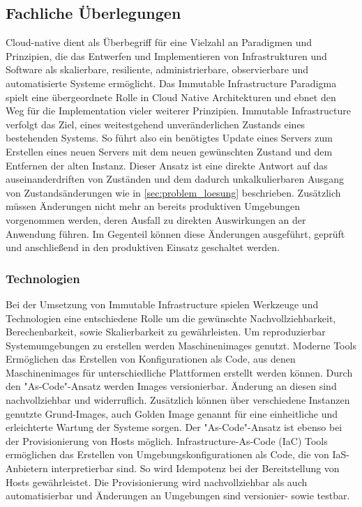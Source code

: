 \documentclass[11pt]{scrartcl}
\begin{document}
\subsection{Fachliche Überlegungen}
Cloud-native dient als Überbegriff für eine Vielzahl an Paradigmen und Prinzipien, die das Entwerfen und Implementieren von Infrastrukturen und Software als skalierbare, resiliente, administrierbare, observierbare und automatisierte Systeme ermöglicht.
Das Immutable Infrastructure Paradigma spielt eine übergeordnete Rolle in Cloud Native Architekturen und ebnet den Weg für die Implementation vieler weiterer Prinzipien. Immutable Infrastructure verfolgt das Ziel, eines weitestgehend unveränderlichen Zustands eines bestehenden Systems. So führt also ein benötigtes Update eines Servers zum Erstellen eines neuen Servers mit dem neuen gewünschten Zustand und dem Entfernen der alten Instanz. Dieser Ansatz ist eine direkte Antwort auf das auseinanderdriften von Zuständen und dem dadurch unkalkulierbaren Ausgang von Zustandsänderungen wie in \cref{sec:problem_loesung} beschrieben. Zusätzlich müssen Änderungen nicht mehr an bereits produktiven Umgebungen vorgenommen werden, deren Ausfall zu direkten Auswirkungen an der Anwendung führen. Im Gegenteil können diese Änderungen ausgeführt, geprüft und anschließend in den produktiven Einsatz geschaltet werden.
\subsubsection{Technologien} 
Bei der Umsetzung von Immutable Infrastructure spielen Werkzeuge und Technologien eine entschiedene Rolle um die gewünschte Nachvollziehbarkeit, Berechenbarkeit, sowie Skalierbarkeit zu gewährleisten.
\newline Um reproduzierbar Systemumgebungen zu erstellen werden Maschinenimages genutzt. Moderne Tools Ermöglichen das Erstellen von Konfigurationen als Code, aus denen Maschinenimages für unterschiedliche Plattformen erstellt werden können. Durch den "As-Code"-Ansatz werden Images versionierbar. Änderung an diesen sind nachvollziehbar und widerruflich. Zusätzlich können über verschiedene Instanzen genutzte Grund-Images, auch Golden Image \cite{GoldenImage:2018} genannt für eine einheitliche und erleichterte Wartung der Systeme sorgen. 
\newline
Der "As-Code"-Ansatz ist ebenso bei der Provisionierung von Hosts möglich. Infrastructure-As-Code (IaC) Tools ermöglichen das Erstellen von Umgebungskonfigurationen als Code, die von IaS-Anbietern interpretierbar sind. So wird Idempotenz bei der Bereitstellung von Hosts gewährleistet. Die Provisionierung wird nachvollziehbar als auch automatisierbar und Änderungen an Umgebungen sind versionier- sowie testbar.
\end{document}
